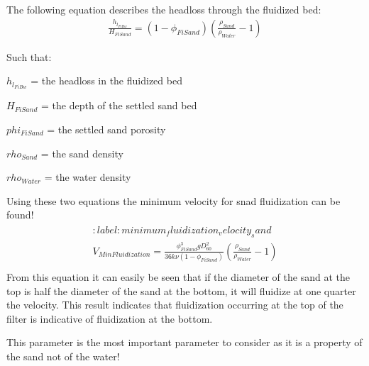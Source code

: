 \documentclass[letterpaper,10pt,english]{sphinxmanual}
\begin{document}
The following equation describes the headloss through the fluidized bed:
\begin{equation}\label{equation:Filtration/Filtration_Design:headloss_fluidzed_bed}
\begin{split} \frac{h_{l_{FiBw}}}{H_{FiSand}} = \left( 1 - \phi_{FiSand} \right)\left( \frac{\rho_{Sand}}{\rho_{Water}} - 1 \right)\end{split}
\end{equation}
\begin{DUlineblock}{0em}
\item[] Such that:
\item[] \(h_{l_{FiBw}}\) = the headloss in the fluidized bed
\item[] \(H_{FiSand}\) =  the depth of the settled sand bed
\item[] \(phi_{FiSand}\) = the settled sand porosity
\item[] \(rho_{Sand}\)  = the sand density
\item[] \(rho_{Water}\) = the water density
\end{DUlineblock}

Using these two equations the minimum velocity for snad fluidization can be found!
\begin{align}\label{equation:Filtration/Filtration_Design:Filtration/Filtration_Design:1}\!\begin{aligned}
:label: minimum_fluidization_velocity_sand\\
V_{MinFluidization} = \frac{\phi_{FiSand}^3 g D_{60}^2}{36 k \nu \left( 1 - \phi_{FiSand} \right)} \left( \frac{\rho_{Sand}}{\rho_{Water}} - 1 \right)\\
\end{aligned}\end{align}
From this equation it can easily be seen that if the diameter of the sand at the top is half the diameter of the sand at the bottom, it will fluidize at one quarter the velocity. This result indicates that fluidization occurring at the top of the filter is  indicative of fluidization at the bottom.

This parameter is the most important parameter to consider as it is a property of the sand not of the water!
\end{document}
